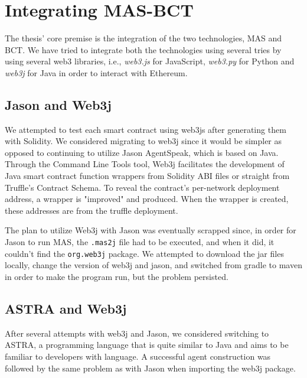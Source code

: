\vspace{.5cm}



\section{Integrating \ac{MAS}-\ac{BCT}}

The thesis' core premise is the integration of the two technologies, \ac{MAS} and \ac{BCT}. We have tried to integrate both the technologies using several tries by using several web3 libraries, i.e., \textit{web3.js} for JavaScript, \textit{web3.py} for Python and \textit{web3j} for Java in order to interact with Ethereum.

\subsection{Jason and Web3j}

We attempted to test each smart contract using web3js after generating them with Solidity. We considered migrating to web3j since it would be simpler as opposed to continuing to utilize Jason AgentSpeak, which is based on Java. Through the Command Line Tools tool, Web3j facilitates the development of Java smart contract function wrappers from Solidity ABI files or straight from Truffle's Contract Schema. To reveal the contract's per-network deployment address, a wrapper is "improved" and produced. When the wrapper is created, these addresses are from the truffle deployment.

\vspace{.5cm}

The plan to utilize Web3j with Jason was eventually scrapped since, in order for Jason to run \ac{MAS}, the \texttt{.mas2j} file had to be executed, and when it did, it couldn't find the \texttt{org.web3j} package. We attempted to download the jar files locally, change the version of web3j and jason, and switched from gradle to maven in order to make the program run, but the problem persisted.

\subsection{\ac{ASTRA} and Web3j}

After several attempts with web3j and Jason, we considered switching to \ac{ASTRA}, a programming language that is quite similar to Java and aims to be familiar to developers with language. A successful agent construction was followed by the same problem as with Jason when importing the web3j package.

